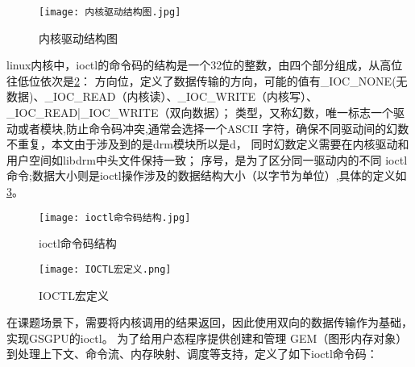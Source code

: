 \begin{figure}[h]
  \centering
  \texttt{[image: 内核驱动结构图.jpg]}
  \caption{内核驱动结构图}
  \label{fig:内核驱动结构图}
\end{figure}

linux内核中，ioctl的命令码的结构是一个32位的整数，由四个部分组成，从高位往低位依次是\ref{fig:ioctl命令码结构}：
方向位，定义了数据传输的方向，可能的值有\_IOC\_NONE(无数据)、\_IOC\_READ（内核读）、\_IOC\_WRITE（内核写）、\_IOC\_READ|\_IOC\_WRITE（双向数据）；
类型，又称幻数，唯一标志一个驱动或者模块,防止命令码冲突,通常会选择一个ASCII 字符，确保不同驱动间的幻数不重复，本文由于涉及到的是drm模块所以是d，
同时幻数定义需要在内核驱动和用户空间如libdrm中头文件保持一致；
序号，是为了区分同一驱动内的不同 ioctl 命令;数据大小则是ioctl操作涉及的数据结构大小（以字节为单位）,具体的定义如\ref{fig:IOCTL宏定义}。

\begin{figure}[h]
  \centering
  \texttt{[image: ioctl命令码结构.jpg]}
  \caption{ioctl命令码结构}
  \label{fig:ioctl命令码结构}
\end{figure}

\begin{figure}[h]
  \centering
  \texttt{[image: IOCTL宏定义.png]}
  \caption{IOCTL宏定义}
  \label{fig:IOCTL宏定义}
\end{figure}

在课题场景下，需要将内核调用的结果返回，因此使用双向的数据传输作为基础，实现GSGPU的ioctl。
为了给用户态程序提供创建和管理 GEM（图形内存对象）到处理上下文、命令流、内存映射、调度等支持，定义了如下ioctl命令码：


